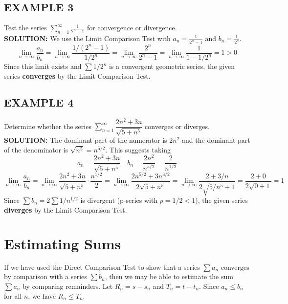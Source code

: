 \documentclass{article}
\theoremstyle{mystyle}
\begin{document}
\subsection*{EXAMPLE 3}
Test the series \( \sum_{n=1}^{\infty} \frac{1}{2^n - 1} \) for convergence or divergence.\\
\textbf{SOLUTION:}
We use the Limit Comparison Test with $a_n = \frac{1}{2^n - 1}$ and $b_n = \frac{1}{2^n}$.
\[ \lim_{n \to \infty} \frac{a_n}{b_n} = \lim_{n \to \infty} \frac{1/(2^n - 1)}{1/2^n} = \lim_{n \to \infty} \frac{2^n}{2^n - 1} = \lim_{n \to \infty} \frac{1}{1 - 1/2^n} = 1 > 0 \]
Since this limit exists and $\sum 1/2^n$ is a convergent geometric series, the given series \textbf{converges} by the Limit Comparison Test.

\subsection*{EXAMPLE 4}
Determine whether the series \( \sum_{n=1}^{\infty} \dfrac{2n^2 + 3n}{\sqrt{5 + n^5}} \) converges or diverges.\\
\textbf{SOLUTION:}
The dominant part of the numerator is $2n^2$ and the dominant part of the denominator is $\sqrt{n^5} = n^{5/2}$. This suggests taking
\[ a_n = \frac{2n^2 + 3n}{\sqrt{5 + n^5}} \quad b_n = \frac{2n^2}{n^{5/2}} = \frac{2}{n^{1/2}} \]
\[ \lim_{n \to \infty} \frac{a_n}{b_n} = \lim_{n \to \infty} \frac{2n^2 + 3n}{\sqrt{5 + n^5}} \cdot \frac{n^{1/2}}{2} = \lim_{n \to \infty} \frac{2n^{5/2} + 3n^{3/2}}{2\sqrt{5 + n^5}} = \lim_{n \to \infty} \frac{2 + 3/n}{2\sqrt{5/n^5 + 1}} = \frac{2+0}{2\sqrt{0+1}} = 1 \]
Since $\sum b_n = 2\sum 1/n^{1/2}$ is divergent (p-series with $p = 1/2 < 1$), the given series \textbf{diverges} by the Limit Comparison Test.

\section*{Estimating Sums}
If we have used the Direct Comparison Test to show that a series \( \sum a_n \) converges by comparison with a series \( \sum b_n \), then we may be able to estimate the sum \( \sum a_n \) by comparing remainders. Let \(R_n = s - s_n\) and \(T_n = t - t_n\). Since \(a_n \le b_n\) for all \(n\), we have \(R_n \le T_n\).
\end{document}
